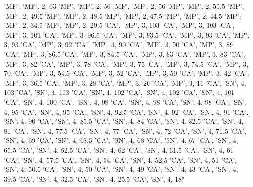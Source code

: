 \documentclass[
]{book}
\newenvironment{Shaded}{\begin{snugshade}}{\end{snugshade}}
\newcommand{\StringTok}[1]{\textcolor[rgb]{0.31,0.60,0.02}{#1}}
\begin{document}
\begin{Shaded}
\begin{Highlighting}[]
\StringTok{ 'MP', 'MP', 2, 63}
\StringTok{ 'MP', 'MP', 2, 56}
\StringTok{ 'MP', 'MP', 2, 56}
\StringTok{ 'MP', 'MP', 2, 55.5}
\StringTok{ 'MP', 'MP', 2, 49.5}
\StringTok{ 'MP', 'MP', 2, 48.5}
\StringTok{ 'MP', 'MP', 2, 47.5}
\StringTok{ 'MP', 'MP', 2, 44.5}
\StringTok{ 'MP', 'MP', 2, 34.5}
\StringTok{ 'MP', 'MP', 2, 29.5}
\StringTok{ 'CA', 'MP', 3, 103}
\StringTok{ 'CA', 'MP', 3, 103}
\StringTok{ 'CA', 'MP', 3, 101}
\StringTok{ 'CA', 'MP', 3, 96.5}
\StringTok{ 'CA', 'MP', 3, 93.5}
\StringTok{ 'CA', 'MP', 3, 93}
\StringTok{ 'CA', 'MP', 3, 93}
\StringTok{ 'CA', 'MP', 3, 92}
\StringTok{ 'CA', 'MP', 3, 90}
\StringTok{ 'CA', 'MP', 3, 90}
\StringTok{ 'CA', 'MP', 3, 89}
\StringTok{ 'CA', 'MP', 3, 86.5}
\StringTok{ 'CA', 'MP', 3, 84.5}
\StringTok{ 'CA', 'MP', 3, 83}
\StringTok{ 'CA', 'MP', 3, 83}
\StringTok{ 'CA', 'MP', 3, 82}
\StringTok{ 'CA', 'MP', 3, 78}
\StringTok{ 'CA', 'MP', 3, 75}
\StringTok{ 'CA', 'MP', 3, 74.5}
\StringTok{ 'CA', 'MP', 3, 70}
\StringTok{ 'CA', 'MP', 3, 54.5}
\StringTok{ 'CA', 'MP', 3, 52}
\StringTok{ 'CA', 'MP', 3, 50}
\StringTok{ 'CA', 'MP', 3, 42}
\StringTok{ 'CA', 'MP', 3, 36.5}
\StringTok{ 'CA', 'MP', 3, 28}
\StringTok{ 'CA', 'MP', 3, 26}
\StringTok{ 'CA', 'MP', 3, 11}
\StringTok{ 'CA', 'SN', 4, 103}
\StringTok{ 'CA', 'SN', 4, 103}
\StringTok{ 'CA', 'SN', 4, 102}
\StringTok{ 'CA', 'SN', 4, 102}
\StringTok{ 'CA', 'SN', 4, 101}
\StringTok{ 'CA', 'SN', 4, 100}
\StringTok{ 'CA', 'SN', 4, 98}
\StringTok{ 'CA', 'SN', 4, 98}
\StringTok{ 'CA', 'SN', 4, 98}
\StringTok{ 'CA', 'SN', 4, 95}
\StringTok{ 'CA', 'SN', 4, 95}
\StringTok{ 'CA', 'SN', 4, 92.5}
\StringTok{ 'CA', 'SN', 4, 92}
\StringTok{ 'CA', 'SN', 4, 91}
\StringTok{ 'CA', 'SN', 4, 90}
\StringTok{ 'CA', 'SN', 4, 85.5}
\StringTok{ 'CA', 'SN', 4, 84}
\StringTok{ 'CA', 'SN', 4, 82.5}
\StringTok{ 'CA', 'SN', 4, 81}
\StringTok{ 'CA', 'SN', 4, 77.5}
\StringTok{ 'CA', 'SN', 4, 77}
\StringTok{ 'CA', 'SN', 4, 72}
\StringTok{ 'CA', 'SN', 4, 71.5}
\StringTok{ 'CA', 'SN', 4, 69}
\StringTok{ 'CA', 'SN', 4, 68.5}
\StringTok{ 'CA', 'SN', 4, 68}
\StringTok{ 'CA', 'SN', 4, 67}
\StringTok{ 'CA', 'SN', 4, 65.5}
\StringTok{ 'CA', 'SN', 4, 62.5}
\StringTok{ 'CA', 'SN', 4, 62}
\StringTok{ 'CA', 'SN', 4, 61.5}
\StringTok{ 'CA', 'SN', 4, 61}
\StringTok{ 'CA', 'SN', 4, 57.5}
\StringTok{ 'CA', 'SN', 4, 54}
\StringTok{ 'CA', 'SN', 4, 52.5}
\StringTok{ 'CA', 'SN', 4, 51}
\StringTok{ 'CA', 'SN', 4, 50.5}
\StringTok{ 'CA', 'SN', 4, 50}
\StringTok{ 'CA', 'SN', 4, 49}
\StringTok{ 'CA', 'SN', 4, 43}
\StringTok{ 'CA', 'SN', 4, 39.5}
\StringTok{ 'CA', 'SN', 4, 32.5}
\StringTok{ 'CA', 'SN', 4, 25.5}
\StringTok{ 'CA', 'SN', 4, 18"}


\end{Highlighting}
\end{Shaded}
\end{document}
